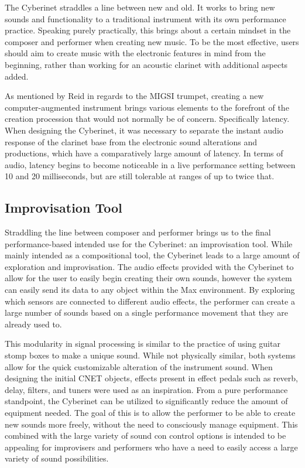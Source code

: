 The Cyberinet straddles a line between new and old. It works to bring new sounds and functionality to a traditional instrument with its own performance practice. Speaking purely practically, this brings about a certain mindset in the composer and performer when creating new music. To be the most effective, users should aim to create music with the electronic features in mind from the beginning, rather than working for an acoustic clarinet with additional aspects added. 

As mentioned by Reid in regards to the MIGSI trumpet, creating a new computer-augmented instrument brings various elements to the forefront of the creation procession that would not normally be of concern. Specifically latency\cite{reid_2019}. When designing the Cyberinet, it was necessary to separate the instant audio response of the clarinet base from the electronic sound alterations and productions, which have a comparatively large amount of latency. In terms of audio, latency begins to become noticeable in a live performance setting between 10 and 20 milliseconds, but are still tolerable at ranges of up to twice that\cite{latency2004}. %


\subsection{Improvisation Tool}
Straddling the line between composer and performer brings us to the final performance-based intended use for the Cyberinet: an improvisation tool. While mainly intended as a compositional tool, the Cyberinet leads to a large amount of exploration and improvisation. The audio effects provided with the Cyberinet to allow for the user to easily begin creating their own sounds, however the system can easily send its data to any object within the Max environment. By exploring which sensors are connected to different audio effects, the performer can create a large number of sounds based on a single performance movement that they are already used to.

This modularity in signal processing is similar to the practice of using guitar stomp boxes to make a unique sound. While not physically similar, both systems allow for the quick customizable alteration of the instrument sound. When designing the initial CNET objects, effects present in effect pedals such as reverb, delay, filters, and tuners were used as an inspiration. From a pure performance standpoint, the Cyberinet can be utilized to significantly reduce the amount of equipment needed. The goal of this is to allow the performer to be able to create new sounds more freely, without the need to consciously manage equipment. This combined with the large variety of sound con control options is intended to be appealing for improvisers and performers who have a need to easily access a large variety of sound possibilities.


